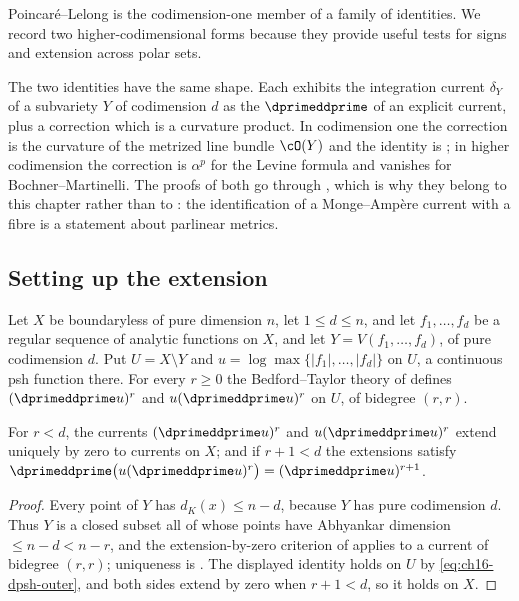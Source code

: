 Poincar\'e--Lelong is the codimension-one member of a family of identities.
We record two higher-codimensional forms because they provide useful tests
for signs and extension across polar sets.

The two identities have the same shape.  Each exhibits the integration
current $\delta_Y$ of a subvariety $Y$ of codimension $d$ as the
$\dprimeddprime$ of an explicit current, plus a correction which is a
curvature product.  In codimension one the correction is the curvature of
the metrized line bundle $\cO(Y)$ and the identity is
; in higher codimension the correction is
$\alpha^p$ for the Levine formula and vanishes for
Bochner--Martinelli.  The proofs of both go through
, which is why they belong to this
chapter rather than to : the identification of
a Monge--Amp\`ere current with a fibre is a statement about parlinear
metrics.

\subsection{Setting up the extension}
\label{sec:ch17-bm-setup}

Let $X$ be boundaryless of pure dimension $n$, let $1\le d\le n$, and let
$f_1,\dots,f_d$ be a regular sequence of analytic functions on $X$, and
let $Y=V(f_1,\dots,f_d)$, of pure codimension $d$.  Put
$U=X\setminus Y$ and $u=\log\max\{|f_1|,\dots,|f_d|\}$ on $U$, a
continuous psh function there.  For every $r\ge0$ the Bedford--Taylor
theory of  defines
$(\dprimeddprime u)^r$ and $u(\dprimeddprime u)^r$ on $U$, of bidegree
$(r,r)$.

\begin{lemma}
\label{lem:ch17-bm-extension}
For $r<d$, the currents $(\dprimeddprime u)^r$ and
$u(\dprimeddprime u)^r$ extend uniquely by zero to currents on $X$; and
if $r+1<d$ the extensions satisfy
$\dprimeddprime\bigl(u(\dprimeddprime u)^r\bigr)=(\dprimeddprime u)^{r+1}$.
\end{lemma}

\begin{proof}
Every point of $Y$ has $d_K(x)\le n-d$, because $Y$ has pure
codimension $d$.  Thus $Y$ is a closed subset all of whose points have
Abhyankar dimension $\le n-d<n-r$, and the extension-by-zero criterion of
 applies to a current of bidegree
$(r,r)$; uniqueness is .  The displayed
identity holds on $U$ by \eqref{eq:ch16-dpsh-outer}, and both sides extend
by zero when $r+1<d$, so it holds on $X$.
\end{proof}

